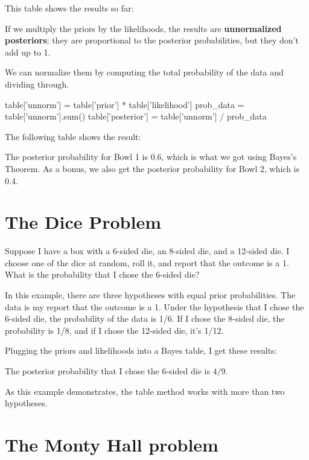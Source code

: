\documentclass[12pt]{book}
\theoremstyle{exercise}
\begin{document}
This table shows the results so far:



If we multiply the priors by the likelihoods, the results are {\bf unnormalized posteriors}; they are proportional to the posterior probabilities, but they don't add up to 1.

We can normalize them by computing the total probability of the data and dividing through.

\begin{code}
table['unnorm'] = table['prior'] * table['likelihood']
prob_data = table['unnorm'].sum()
table['posterior'] = table['unnorm'] / prob_data
\end{code}

The following table shows the result:



The posterior probability for Bowl 1 is 0.6, which is what we got using Bayes's Theorem.  As a bonus, we also get the posterior probability for Bowl 2, which is 0.4.


\section{The Dice Problem}
\label{dice}

Suppose I have a box with a 6-sided die, an 8-sided die, and a 12-sided die.
I choose one of the dice at random, roll it, and report that the outcome is a 1.
What is the probability that I chose the 6-sided die?

In this example, there are three hypotheses with equal prior probabilities.
The data is my report that the outcome is a 1.
Under the hypothesis that I chose the 6-sided die, the probability of the data is 1/6.
If I chose the 8-sided die, the probability is 1/8, and if I chose the 12-sided die, it's 1/12.

Plugging the priors and likelihoods into a Bayes table, I get these results:



The posterior probability that I chose the 6-sided die is $4/9$.

As this example demonstrates, the table method works with more than two hypotheses.



\section{The Monty Hall problem}
\end{document}
